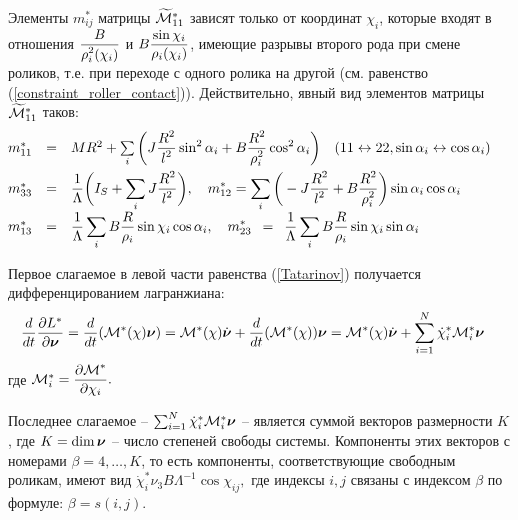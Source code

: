Элементы $m^*_{ij}$ матрицы $\widetilde{\mathcal{M}}^*_{11}$ зависят только от координат $\chi_i$, которые входят в отношения $\displaystyle\frac{\displaystyle B}{\displaystyle \rho_i^2(\chi_i)}$ и $B\displaystyle\frac{\displaystyle \sin\chi_i}{\displaystyle \rho_i(\chi_i)}$, имеющие разрывы второго рода при смене роликов, т.е. при переходе с одного ролика на другой (см. равенство (\ref{constraint_roller_contact})). Действительно, явный вид элементов матрицы $\widetilde{\mathcal{M}}^*_{11}$ таков:
\begin{equation}\label{mstar}
    \hspace{-15pt}
    \begin{array}{rcl}
        m^*_{11} & = & MR^2 + \sum\limits_i \bigg( J\ddfrac{R^2}{l^2}\sin^2\alpha_i + B\ddfrac{R^2}{\rho_i^2}\cos^2\alpha_i\bigg)\quad(11 \leftrightarrow 22, \sin\alpha_i \leftrightarrow \cos\alpha_i)\vsp
        m^*_{33} & = & \ddfrac{1}{\Lambda}\bigg(I_S + \sum\limits_i J\ddfrac{R^2}{l^2}\bigg),\quad
        m^*_{12}  =  \sum\limits_i \bigg(-J\ddfrac{R^2}{l^2} + B\ddfrac{R^2}{\rho_i^2}\bigg)\sin\alpha_i\cos\alpha_i\vsp
        m^*_{13} & = & \ddfrac{1}{\Lambda}\sum\limits_i B\ddfrac{R}{\rho_i}\sin\chi_i\cos\alpha_i,
        \quad
        m^*_{23} \enspace = \enspace \ddfrac{1}{\Lambda}\sum\limits_i B\ddfrac{R}{\rho_i}\sin\chi_i\sin\alpha_i
    \end{array}
\end{equation}

Первое слагаемое в левой части равенства (\ref{Tatarinov}) получается дифференцированием лагранжиана:
\begin{equation}\label{DLStarDnuDdt}
    \hspace{-10pt}
    \frac{d}{dt}\frac{\partial L^{*}}{\partial \vnu} = \frac{d}{dt}(\M^*(\chi)\vnu) = 
    \M^*(\chi)\dot{\vnu} +
    \frac{d}{dt}(\M^*(\chi))\vnu =
    \M^*(\chi)\dot{\vnu} +
    \sum_{i=1}^{N}\dot{\chi}_i^*\M^*_i\vnu
\end{equation}
где $\mathcal{M}^*_i = \displaystyle\frac{\displaystyle \partial \mathcal{M}^*}{\displaystyle \partial \chi_i}.$

Последнее слагаемое -- $\sum_{i=1}^{N}\dot{\chi}_i^*\mathcal{M}^*_i\boldsymbol{\mathbf{\nu}}$ -- является суммой векторов размерности $K$, где $K = \dim\boldsymbol{\mathbf{\nu}}$ -- число степеней свободы системы. Компоненты этих векторов с номерами $\beta = 4,\dots, K$, то есть компоненты, соответствующие свободным роликам, имеют вид $\dot{\chi}_i^*\nu_3B\Lambda^{-1}\cos\chi_{ij},$ где индексы $i,j$ связаны с индексом $\beta$ по формуле: $\beta = s(i, j)$.

